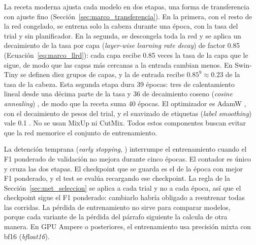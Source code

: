 La receta moderna ajusta cada modelo en dos etapas, una forma de transferencia con ajuste fino
(Sección~\ref{sec:marco_transferencia}). En la primera, con el resto de la red congelado, se entrena solo la cabeza durante
una época, con la tasa del trial y sin planificador. En la segunda, se descongela toda la red y se aplica un decaimiento de
la tasa por capa (\emph{layer-wise learning rate decay}) de factor 0.85 (Ecuación~\ref{eq:marco_llrd}): cada capa recibe
0.85 veces la tasa de la capa que le sigue, de modo que las capas más cercanas a la entrada cambian menos. En Swin-Tiny se
definen diez grupos de capas, y la de entrada recibe $0.85^{9} \approx 0.23$ de la tasa de la cabeza. Esta segunda etapa
dura 39 épocas: tres de calentamiento lineal desde una décima parte de la tasa y 36 de decaimiento coseno
(\emph{cosine annealing}) \cite{goyal2017accurate,loshchilov2017sgdr}, de modo que la receta suma 40 épocas. El optimizador
es AdamW \cite{loshchilov2019decoupled}, con el decaimiento de pesos del trial, y el suavizado de etiquetas
(\emph{label smoothing}) vale 0.1 \cite{szegedy2016rethinking,muller2019does}. No se usan MixUp ni CutMix. Todos estos
componentes buscan evitar que la red memorice el conjunto de entrenamiento.

La detención temprana (\emph{early stopping}, \cite{goodfellow2016deep}) interrumpe el entrenamiento cuando el F1 ponderado
de validación no mejora durante cinco épocas. El contador es único y cruza las dos etapas. El checkpoint que se guarda es el
de la época con mejor F1 ponderado, y el test se evalúa recargando ese checkpoint. La regla de la
Sección~\ref{sec:met_seleccion} se aplica a cada trial y no a cada época, así que el checkpoint sigue el F1 ponderado:
cambiarlo habría obligado a reentrenar todas las corridas. La pérdida de entrenamiento no sirve para comparar modelos,
porque cada variante de la pérdida del párrafo siguiente la calcula de otra manera. En GPU Ampere o posteriores, el
entrenamiento usa precisión mixta con bf16 (\emph{bfloat16}).

